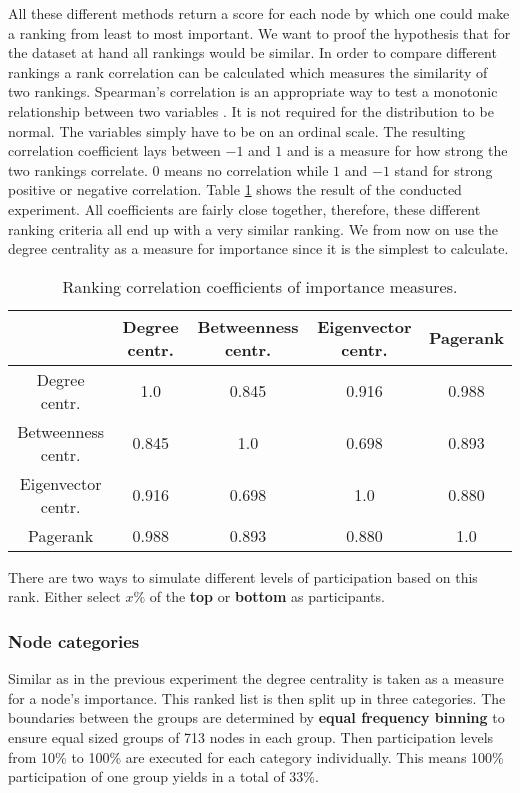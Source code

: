 \documentclass[final]{fhnwreport}       %
\begin{document}
All these different methods return a score for each node by which one could make a ranking from least to most important. We want to proof the hypothesis that for the dataset at hand all rankings would be similar. In order to compare different rankings a rank correlation can be calculated which measures the similarity of two rankings. Spearman's correlation is an appropriate way to test a monotonic relationship between two variables \citep{noauthor_resources_nodate}. It is not required for the distribution to be normal. The variables simply have to be on an ordinal scale. The resulting correlation coefficient lays between $-1$ and $1$ and is a measure for how strong the two rankings correlate. $0$ means no correlation while $1$ and $-1$ stand for strong positive or negative correlation. Table \ref{tab:spearman} shows the result of the conducted experiment. All coefficients are fairly close together, therefore, these different ranking criteria all end up with a very similar ranking. We from now on use the degree centrality as a measure for importance since it is the simplest to calculate.

\begin{table}[H]
\centering
\begin{tabular}{c | cccc} 
{} & {Degree centr.} & {Betweenness centr.} & {Eigenvector centr.} & {Pagerank} \\ \hline 
{Degree centr.} & {1.0} & {0.845} & {0.916} & {0.988} \\ 
{Betweenness centr.} & {0.845} & {1.0} & {0.698} & {0.893}\\
{Eigenvector centr.} & {0.916} & {0.698} & {1.0} & {0.880} \\
{Pagerank} & {0.988} & {0.893} & {0.880} & {1.0} \\
\end{tabular}
\caption{Ranking correlation coefficients of importance measures.}
\label{tab:spearman}
\end{table}

There are two ways to simulate different levels of participation based on this rank. Either select $x\%$ of the \textbf{top} or \textbf{bottom} as participants. 

\subsubsection{Node categories}
Similar as in the previous experiment the degree centrality is taken as a measure for a node's importance. This ranked list is then split up in three categories. The boundaries between the groups are determined by \textbf{equal frequency binning} to ensure equal sized groups of 713 nodes in each group. Then participation levels from 10\% to 100\% are executed for each category individually. This means 100\% participation of one group yields in a total of 33\%. 
\end{document}
